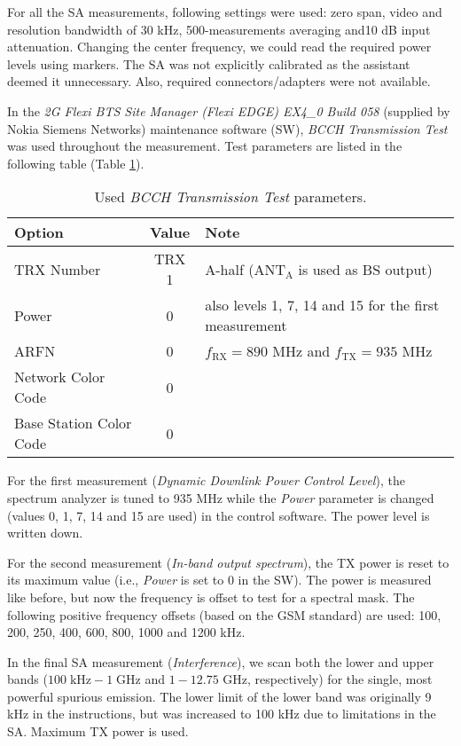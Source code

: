 \documentclass[a4paper, 12pt]{article}
\begin{document}
For all the SA measurements, following settings were used: zero span, 
video and resolution bandwidth of 30 kHz, 500-measurements averaging 
and10 dB input attenuation. Changing the center frequency, we could 
read the required power levels using markers. The SA was not explicitly 
calibrated as the assistant deemed it unnecessary. Also, required 
connectors/adapters were not available.

In the \textit{2G Flexi BTS Site Manager (Flexi EDGE) EX4\_0 Build 058} 
(supplied by Nokia Siemens Networks) maintenance software (SW), 
\textit{BCCH Transmission Test} was used throughout the measurement. 
Test parameters are listed in the following table (Table \ref{tbl:bcch}). 

\begin{table}[!h]
	\begin{center}
	\caption{Used \textit{BCCH Transmission Test} parameters.}
	\label{tbl:bcch}
	\renewcommand*{\arraystretch}{1.2}
	\begin{tabular}{lcl}
	\textbf{Option} 		& \textbf{Value} 	& \textbf{Note} \\
	\hline
	TRX Number				& TRX 1				& A-half (ANT$_\mathrm{A}$ is used as BS output) \\
	Power					& 0					& also levels 1, 7, 14 and 15 for the first measurement \\
	ARFN					& 0					& $f_\mathrm{RX} = 890$ MHz and $f_\mathrm{TX} = 935$ MHz \\
	Network Color Code		& 0					& \\
	Base Station Color Code & 0					&
	\end{tabular}
	\end{center}
	\vspace*{-12pt}
\end{table}

For the first measurement (\textit{Dynamic Downlink Power Control Level}), 
the spectrum analyzer is tuned to 935 MHz while the \textit{Power} parameter 
is changed (values 0, 1, 7, 14 and 15 are used) in the control software. 
The power level is written down.

For the second measurement (\textit{In-band output spectrum}), the TX power 
is reset to its maximum value (i.e., \textit{Power} is set to 0 in the SW).
The power is measured like before, but now the frequency is offset to test 
for a spectral mask. The following positive frequency offsets (based on the 
GSM standard) are used: 100, 200, 250, 400, 600, 800, 1000 and 1200 kHz.

In the final SA measurement (\textit{Interference}), we scan both the lower 
and upper bands ($100 \mathrm{\;kHz} - 1 \mathrm{\;GHz}$ and $1 - 12.75$ GHz, 
respectively) for the single, most powerful spurious emission. The lower limit
of the lower band was originally 9 kHz in the instructions, but was increased 
to 100 kHz due to limitations in the SA. Maximum TX power is used.
\end{document}

